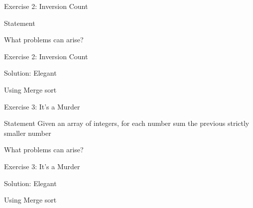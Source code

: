 \documentclass{beamer}
\begin{document}
\begin{frame}{Exercise 2: Inversion Count}
  
  \begin{overlayarea}{\textwidth}{\textheight}
  \begin{block}{Statement}
  \end{block}
  
  \begin{example}
  \end{example}
  
  \begin{block}{What problems can arise?}
  \end{block}
  \end{overlayarea}
  
\end{frame}

\begin{frame}[fragile]{Exercise 2: Inversion Count}
  
  \begin{code}{Solution: Elegant}
    \begin{PseudoCode}
Using Merge sort
    \end{PseudoCode}
  \end{code}
  
\end{frame}

\begin{frame}{Exercise 3: It's a Murder}
  
  \begin{overlayarea}{\textwidth}{\textheight}
  \begin{block}{Statement}
    Given an array of integers, for each number sum the previous strictly smaller number 
  \end{block}
  
  \begin{example}
  \end{example}
  
  \begin{block}{What problems can arise?}
  \end{block}
  \end{overlayarea}
  
\end{frame}

\begin{frame}[fragile]{Exercise 3: It's a Murder}
  
  \begin{code}{Solution: Elegant}
    \begin{PseudoCode}
Using Merge sort
    \end{PseudoCode}
  \end{code}
  
\end{frame}
\end{document}
